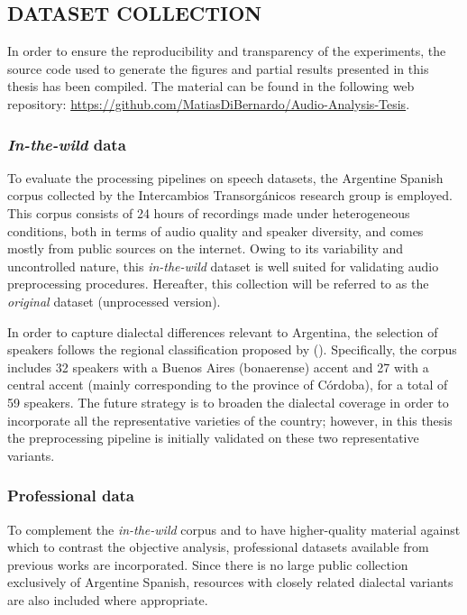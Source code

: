 \subsection{DATASET COLLECTION}
In order to ensure the reproducibility and transparency of the experiments, the source code used to generate the figures and partial results presented in this thesis has been compiled. The material can be found in the following web repository: \url{https://github.com/MatiasDiBernardo/Audio-Analysis-Tesis}.

\subsubsection{\emph{In-the-wild} data}
To evaluate the processing pipelines on speech datasets, the Argentine Spanish corpus collected by the Intercambios Transorgánicos research group is employed. This corpus consists of 24 hours of recordings made under heterogeneous conditions, both in terms of audio quality and speaker diversity, and comes mostly from public sources on the internet. Owing to its variability and uncontrolled nature, this \emph{in-the-wild} dataset is well suited for validating audio preprocessing procedures. Hereafter, this collection will be referred to as the \emph{original} dataset (unprocessed version).

In order to capture dialectal differences relevant to Argentina, the selection of speakers follows the regional classification proposed by (\cite{Fontanella2004español}). Specifically, the corpus includes 32 speakers with a Buenos Aires (bonaerense) accent and 27 with a central accent (mainly corresponding to the province of Córdoba), for a total of 59 speakers. The future strategy is to broaden the dialectal coverage in order to incorporate all the representative varieties of the country; however, in this thesis the preprocessing pipeline is initially validated on these two representative variants.

\subsubsection{Professional data}
\label{sec:datos_profesionales}
To complement the \emph{in-the-wild} corpus and to have higher-quality material against which to contrast the objective analysis, professional datasets available from previous works are incorporated. Since there is no large public collection exclusively of Argentine Spanish, resources with closely related dialectal variants are also included where appropriate.

